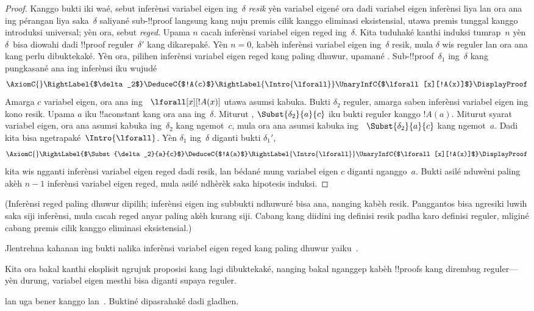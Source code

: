 \documentclass[../../../include/open-logic-section]{subfiles}
\begin{document}
\begin{proof}
Kanggo bukti iki waé, sebut inferènsi variabel eigen
ing~$\delta$ \emph{resik} yèn variabel eigené ora dadi
variabel eigen inferènsi liya lan ora ana ing pérangan
liya saka~$\delta$ saliyané sub-!!{proof} langsung
kang nuju premis cilik kanggo eliminasi eksistensial, utawa
premis tunggal kanggo introduksi universal; yèn ora, sebut \emph{reged}.
Upama $n$ cacah inferènsi variabel eigen reged
ing~$\delta$. Kita tuduhaké kanthi induksi tumrap~$n$
yèn $\delta$~bisa diowahi dadi !!{proof} reguler~$\delta'$
kang dikarepaké. Yèn $n=0$, kabèh inferènsi variabel
eigen ing~$\delta$ resik, mula $\delta$ wis reguler
lan ora ana kang perlu dibuktekaké. Yèn ora, pilihen
inferènsi variabel eigen reged kang paling dhuwur,
upamané \Intro{\lforall}. Sub-!!{proof}~$\delta_1$
ing~$\delta$ kang pungkasané ana ing inferènsi iku
wujudé
    \[
    \AxiomC{}
    \RightLabel{$\delta_2$}
    \DeduceC{$!A(c)$}
    \RightLabel{\Intro{\lforall}}
    \UnaryInfC{$\lforall[x][!A(x)]$}
    \DisplayProof
    \]
Amarga $c$ variabel eigen, ora ana ing
~$\lforall[x][!A(x)]$ utawa asumsi kabuka.
Bukti $\delta_2$ reguler, amarga saben inferènsi
variabel eigen ing kono resik. Upama $a$ iku
!!a{constant} kang ora ana ing~$\delta$.
Miturut ,
$\Subst{\delta_2}{a}{c}$ iku bukti reguler kanggo
$!A(a)$. Miturut syarat variabel eigen, ora ana
asumsi kabuka ing~$\delta_2$ kang ngemot~$c$,
mula ora ana asumsi kabuka ing
~$\Subst{\delta_2}{a}{c}$ kang ngemot~$a$.
Dadi kita bisa ngetrapaké~$\Intro{\lforall}$.
Yèn $\delta_1$ ing~$\delta$ diganti bukti $\delta_1'$,
    \[
    \AxiomC{}
    \RightLabel{$\Subst{\delta_2}{a}{c}$}
    \DeduceC{$!A(a)$}
    \RightLabel{\Intro{\lforall}}
    \UnaryInfC{$\lforall[x][!A(x)]$}
    \DisplayProof
    \]
kita wis ngganti inferènsi variabel eigen reged dadi
resik, lan bédané mung variabel eigen $c$ diganti
nganggo~$a$. Bukti asilé nduwèni paling akèh $n-1$
inferènsi variabel eigen reged, mula asilé ndhèrèk saka
hipotesis induksi.
\end{proof}
(Inferènsi reged paling dhuwur dipilih; inferènsi eigen ing subbukti ndhuwuré bisa ana, nanging kabèh resik. Panggantos bisa ngresiki luwih saka siji inferènsi, mula cacah reged anyar paling akèh kurang siji. Cabang kang diidini ing definisi resik padha karo definisi reguler, mliginé cabang premis cilik kanggo eliminasi eksistensial.)

\begin{prob}
Jlentrehna kahanan ing bukti 
nalika inferènsi variabel eigen reged kang paling
dhuwur yaiku~\Elim{\lexists}.
\end{prob}

Kita ora bakal kanthi eksplisit ngrujuk proposisi kang
lagi dibuktekaké, nanging bakal nganggep kabèh
!!{proof}s kang dirembug reguler---yèn durung,
variabel eigen mesthi bisa diganti supaya reguler.

 lan 
uga bener kanggo  lan~.
Buktiné dipasrahaké dadi gladhen.
\end{document}
